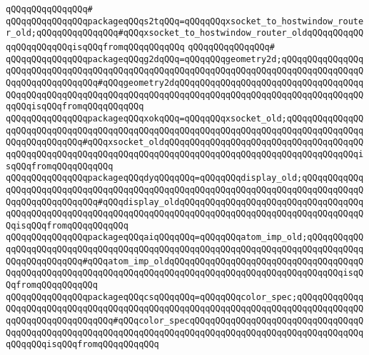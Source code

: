 \verb|qQQqqQQqqQQqqQQq#|\newline
\verb|qQQqqQQqqQQqqQQqpackageqQQqs2tqQQq=qQQqqQQqxsocket_to_hostwindow_router_old;qQQqqQQqqQQqqQQq#qQQqxsocket_to_hostwindow_router_oldqQQqqQQqqQQqqQQqqQQqqQQqisqQQqfromqQQqqQQqqQQq|\newline
\verb|qQQqqQQqqQQqqQQq#|\newline
\verb|qQQqqQQqqQQqqQQqpackageqQQqg2dqQQq=qQQqqQQqgeometry2d;qQQqqQQqqQQqqQQqqQQqqQQqqQQqqQQqqQQqqQQqqQQqqQQqqQQqqQQqqQQqqQQqqQQqqQQqqQQqqQQqqQQqqQQqqQQqqQQqqQQqqQQq#qQQqgeometry2dqQQqqQQqqQQqqQQqqQQqqQQqqQQqqQQqqQQqqQQqqQQqqQQqqQQqqQQqqQQqqQQqqQQqqQQqqQQqqQQqqQQqqQQqqQQqqQQqqQQqqQQqqQQqqQQqisqQQqfromqQQqqQQqqQQq|\newline
\verb|qQQqqQQqqQQqqQQqpackageqQQqxokqQQq=qQQqqQQqxsocket_old;qQQqqQQqqQQqqQQqqQQqqQQqqQQqqQQqqQQqqQQqqQQqqQQqqQQqqQQqqQQqqQQqqQQqqQQqqQQqqQQqqQQqqQQqqQQqqQQqqQQq#qQQqxsocket_oldqQQqqQQqqQQqqQQqqQQqqQQqqQQqqQQqqQQqqQQqqQQqqQQqqQQqqQQqqQQqqQQqqQQqqQQqqQQqqQQqqQQqqQQqqQQqqQQqqQQqqQQqqQQqisqQQqfromqQQqqQQqqQQq|\newline
\verb|qQQqqQQqqQQqqQQqpackageqQQqdyqQQqqQQq=qQQqqQQqdisplay_old;qQQqqQQqqQQqqQQqqQQqqQQqqQQqqQQqqQQqqQQqqQQqqQQqqQQqqQQqqQQqqQQqqQQqqQQqqQQqqQQqqQQqqQQqqQQqqQQqqQQq#qQQqdisplay_oldqQQqqQQqqQQqqQQqqQQqqQQqqQQqqQQqqQQqqQQqqQQqqQQqqQQqqQQqqQQqqQQqqQQqqQQqqQQqqQQqqQQqqQQqqQQqqQQqqQQqqQQqqQQqisqQQqfromqQQqqQQqqQQq|\newline
\verb|qQQqqQQqqQQqqQQqpackageqQQqaiqQQqqQQq=qQQqqQQqatom_imp_old;qQQqqQQqqQQqqQQqqQQqqQQqqQQqqQQqqQQqqQQqqQQqqQQqqQQqqQQqqQQqqQQqqQQqqQQqqQQqqQQqqQQqqQQqqQQqqQQq#qQQqatom_imp_oldqQQqqQQqqQQqqQQqqQQqqQQqqQQqqQQqqQQqqQQqqQQqqQQqqQQqqQQqqQQqqQQqqQQqqQQqqQQqqQQqqQQqqQQqqQQqqQQqqQQqqQQqisqQQqfromqQQqqQQqqQQq|\newline
\verb|qQQqqQQqqQQqqQQqpackageqQQqcsqQQqqQQq=qQQqqQQqcolor_spec;qQQqqQQqqQQqqQQqqQQqqQQqqQQqqQQqqQQqqQQqqQQqqQQqqQQqqQQqqQQqqQQqqQQqqQQqqQQqqQQqqQQqqQQqqQQqqQQqqQQqqQQq#qQQqcolor_specqQQqqQQqqQQqqQQqqQQqqQQqqQQqqQQqqQQqqQQqqQQqqQQqqQQqqQQqqQQqqQQqqQQqqQQqqQQqqQQqqQQqqQQqqQQqqQQqqQQqqQQqqQQqqQQqisqQQqfromqQQqqQQqqQQq|\newline
